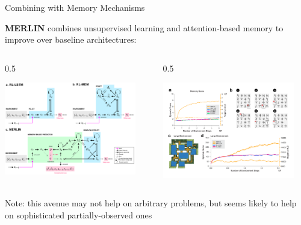 \documentclass[9pt]{beamer}
\newcommand{\twocolumns}[4]{
\begin{columns}
\begin{column}{#1\textwidth}
    #3
\end{column}
\begin{column}{#2\textwidth}
	#4
\end{column}
\end{columns}
}
\begin{document}
\begin{frame}{Combining with Memory Mechanisms}

\textbf{MERLIN} combines unsupervised learning and attention-based memory to improve over baseline architectures:

\twocolumns{0.5}{0.5}{
\begin{center}
\includegraphics[width=0.9\textwidth]{p2-merlin1}
\end{center}
}{
\begin{center}
\includegraphics[width=0.9\textwidth]{p2-merlin2}
\end{center}
}

Note: this avenue may not help on arbitrary problems, but seems likely to help on sophisticated partially-observed ones
\vspace{1em}


\end{frame}
\end{document}
